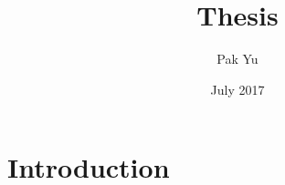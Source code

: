 \documentclass{article}
\title{Thesis}
\author{Pak Yu }
\date{July 2017}
\begin{document}
\maketitle

\section{Introduction}
\end{document}
